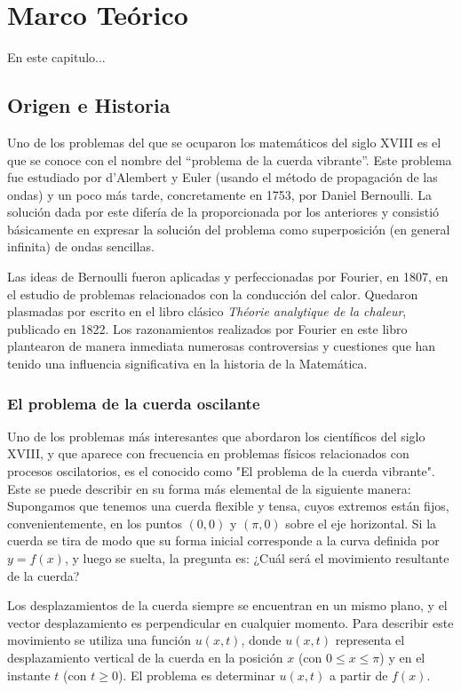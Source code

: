 \chapter{Marco Teórico}\label{ch:Marco_Teórico}
En este capitulo...


\section{Origen e Historia}
Uno de los problemas del que se ocuparon los matemáticos del siglo XVIII es el que se conoce con el nombre del ``problema de la cuerda vibrante''. Este problema fue estudiado por d'Alembert y Euler (usando el método de propagación de las ondas) y un poco más tarde, concretamente en 1753, por Daniel Bernoulli. La solución dada por este difería de la proporcionada por los anteriores y consistió básicamente en expresar la solución del problema como superposición (en general infinita) de ondas sencillas. 

Las ideas de Bernoulli fueron aplicadas y perfeccionadas por Fourier, en 1807, en el estudio de problemas relacionados con la conducción del calor. Quedaron plasmadas por escrito en el libro clásico \emph{Théorie analytique de la chaleur}, publicado en 1822. Los razonamientos realizados por Fourier en este libro plantearon de manera inmediata numerosas controversias y cuestiones que han tenido una influencia significativa en la historia de la Matemática.


\subsection{El problema de la cuerda oscilante}

Uno de los problemas más interesantes que abordaron los científicos del siglo XVIII, y que aparece con frecuencia en problemas físicos relacionados con procesos oscilatorios, es el conocido como "El problema de la cuerda vibrante". Este se puede describir en su forma más elemental de la siguiente manera: Supongamos que tenemos una cuerda flexible y tensa, cuyos extremos están fijos, convenientemente, en los puntos $(0, 0)$ y $(\pi, 0)$ sobre el eje horizontal. Si la cuerda se tira de modo que su forma inicial corresponde a la curva definida por $y = f(x)$, y luego se suelta, la pregunta es: ¿Cuál será el movimiento resultante de la cuerda?

Los desplazamientos de la cuerda siempre se encuentran en un mismo plano, y el vector desplazamiento es perpendicular en cualquier momento. Para describir este movimiento se utiliza una función $u(x, t)$, donde $u(x, t)$ representa el desplazamiento vertical de la cuerda en la posición $x$ (con $0 \leq x \leq \pi$) y en el instante $t$ (con $t \geq 0$). El problema es determinar $u(x, t)$ a partir de $f(x)$.

